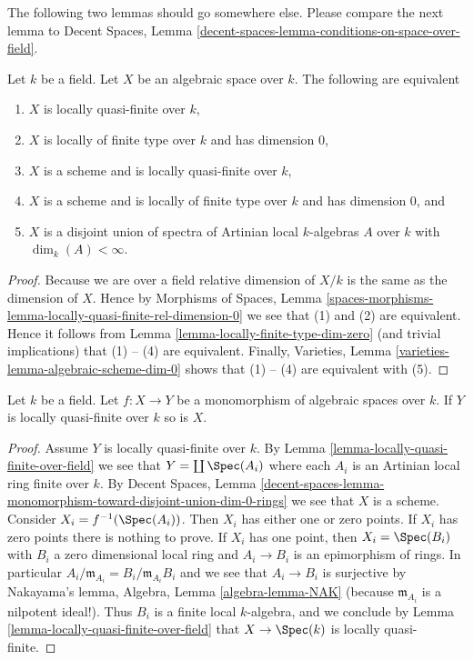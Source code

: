 \noindent
The following two lemmas should go somewhere else.
Please compare the next lemma to
Decent Spaces, Lemma \ref{decent-spaces-lemma-conditions-on-space-over-field}.

\begin{lemma}
\label{lemma-locally-quasi-finite-over-field}
Let $k$ be a field. Let $X$ be an algebraic space over $k$.
The following are equivalent
\begin{enumerate}
\item $X$ is locally quasi-finite over $k$,
\item $X$ is locally of finite type over $k$ and has dimension $0$,
\item $X$ is a scheme and is locally quasi-finite over $k$,
\item $X$ is a scheme and is locally of finite type over $k$ and has
dimension $0$, and
\item $X$ is a disjoint union of spectra of Artinian local $k$-algebras
$A$ over $k$ with $\dim_k(A) < \infty$.
\end{enumerate}
\end{lemma}

\begin{proof}
Because we are over a field relative dimension of $X/k$ is the same as
the dimension of $X$. Hence by
Morphisms of Spaces,
Lemma \ref{spaces-morphisms-lemma-locally-quasi-finite-rel-dimension-0}
we see that (1) and (2) are equivalent. Hence it follows from
Lemma \ref{lemma-locally-finite-type-dim-zero}
(and trivial implications) that (1) -- (4) are equivalent.
Finally,
Varieties, Lemma \ref{varieties-lemma-algebraic-scheme-dim-0}
shows that (1) -- (4) are equivalent with (5).
\end{proof}

\begin{lemma}
\label{lemma-mono-towards-locally-quasi-finite-over-field}
Let $k$ be a field. Let $f : X \to Y$ be a monomorphism of algebraic spaces
over $k$. If $Y$ is locally quasi-finite over $k$ so is $X$.
\end{lemma}

\begin{proof}
Assume $Y$ is locally quasi-finite over $k$. By
Lemma \ref{lemma-locally-quasi-finite-over-field}
we see that $Y = \coprod \Spec(A_i)$ where each $A_i$ is an
Artinian local ring finite over $k$. By
Decent Spaces, Lemma
\ref{decent-spaces-lemma-monomorphism-toward-disjoint-union-dim-0-rings}
we see that $X$ is a scheme. Consider $X_i = f^{-1}(\Spec(A_i))$.
Then $X_i$ has either one or zero points. If $X_i$ has zero points there
is nothing to prove. If $X_i$ has one point, then
$X_i = \Spec(B_i)$ with $B_i$ a zero dimensional local ring
and $A_i \to B_i$ is an epimorphism of rings. In particular
$A_i/\mathfrak m_{A_i} = B_i/\mathfrak m_{A_i}B_i$ and we see that
$A_i \to B_i$ is surjective by Nakayama's lemma,
Algebra, Lemma \ref{algebra-lemma-NAK}
(because $\mathfrak m_{A_i}$ is a nilpotent ideal!).
Thus $B_i$ is a finite local $k$-algebra, and we conclude by
Lemma \ref{lemma-locally-quasi-finite-over-field}
that $X \to \Spec(k)$ is locally quasi-finite.
\end{proof}




